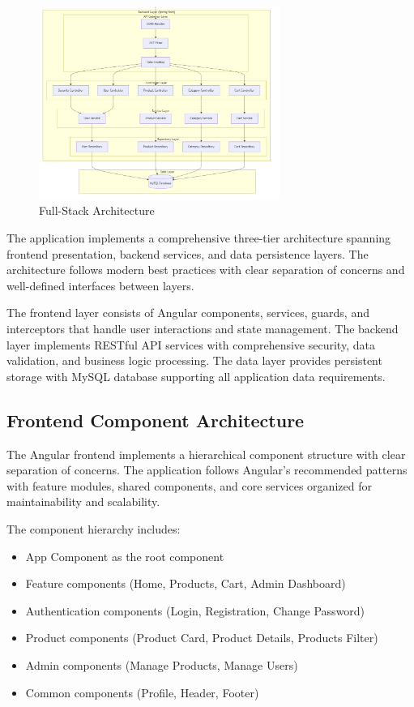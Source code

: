 \documentclass[12pt,a4paper]{article}
\begin{document}
\begin{figure}[H]
    \centering
    \includegraphics[width=0.7\textwidth]{arch2.png}
    \caption{Full-Stack Architecture}
\end{figure}



The application implements a comprehensive three-tier architecture spanning frontend presentation, backend services, and data persistence layers. The architecture follows modern best practices with clear separation of concerns and well-defined interfaces between layers.

The frontend layer consists of Angular components, services, guards, and interceptors that handle user interactions and state management. The backend layer implements RESTful API services with comprehensive security, data validation, and business logic processing. The data layer provides persistent storage with MySQL database supporting all application data requirements.

\subsection{Frontend Component Architecture}

The Angular frontend implements a hierarchical component structure with clear separation of concerns. The application follows Angular's recommended patterns with feature modules, shared components, and core services organized for maintainability and scalability.

The component hierarchy includes:
\begin{itemize}
    \item App Component as the root component
    \item Feature components (Home, Products, Cart, Admin Dashboard)
    \item Authentication components (Login, Registration, Change Password)
    \item Product components (Product Card, Product Details, Products Filter)
    \item Admin components (Manage Products, Manage Users)
    \item Common components (Profile, Header, Footer)
\end{itemize}
\end{document}
